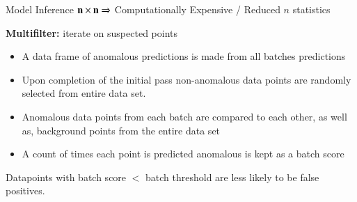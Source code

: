 \begin{frame}{Model Inference}
    $\mathbf{n\times n \Rightarrow}$ Computationally Expensive / Reduced $n$ statistics
    \vfill  
    
    \textbf{Multifilter:} iterate on suspected points 
    \begin{itemize}
        \item A data frame of anomalous predictions is made from all batches predictions
        \item Upon completion of the initial pass non-anomalous data points are randomly selected from entire data set. 
        \item Anomalous data points from each batch are compared to each other, as well as, background points from the entire data set  
        \item A count of times each point is predicted anomalous is kept as a batch score 
    \end{itemize}
    \vfill
    Datapoints with batch score $<$ batch threshold are less likely to be false positives. 
\end{frame}